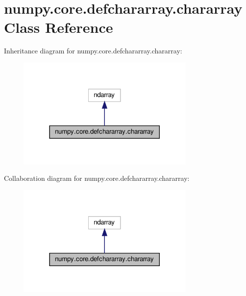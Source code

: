 \hypertarget{classnumpy_1_1core_1_1defchararray_1_1chararray}{}\section{numpy.\+core.\+defchararray.\+chararray Class Reference}
\label{classnumpy_1_1core_1_1defchararray_1_1chararray}


Inheritance diagram for numpy.\+core.\+defchararray.\+chararray\+:
\nopagebreak
\begin{figure}[H]
\begin{center}
\leavevmode
\includegraphics[width=248pt]{classnumpy_1_1core_1_1defchararray_1_1chararray__inherit__graph}
\end{center}
\end{figure}


Collaboration diagram for numpy.\+core.\+defchararray.\+chararray\+:
\nopagebreak
\begin{figure}[H]
\begin{center}
\leavevmode
\includegraphics[width=248pt]{classnumpy_1_1core_1_1defchararray_1_1chararray__coll__graph}
\end{center}
\end{figure}
